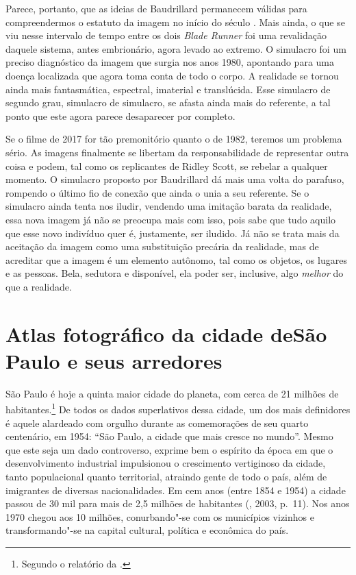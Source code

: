 Parece, portanto, que as ideias de Baudrillard permanecem válidas para
compreendermos o estatuto da imagem no início do século . Mais ainda,
o que se viu nesse intervalo de tempo entre os dois \emph{Blade Runner}
foi uma revalidação daquele sistema, antes embrionário, agora levado ao
extremo. O simulacro foi um preciso diagnóstico da imagem que surgia nos
anos 1980, apontando para uma doença localizada que agora toma conta de
todo o corpo. A realidade se tornou ainda mais fantasmática, espectral,
imaterial e translúcida. Esse simulacro de segundo grau, simulacro de
simulacro, se afasta ainda mais do referente, a tal ponto que este agora
parece desaparecer por completo.

Se o filme de 2017 for tão premonitório quanto o de 1982, teremos um
problema sério. As imagens finalmente se libertam da responsabilidade de
representar outra coisa e podem, tal como os replicantes de Ridley
Scott, se rebelar a qualquer momento. O simulacro proposto por
Baudrillard dá mais uma volta do parafuso, rompendo o último fio de
conexão que ainda o unia a seu referente. Se o simulacro ainda tenta nos
iludir, vendendo uma imitação barata da realidade, essa nova imagem já
não se preocupa mais com isso, pois sabe que tudo aquilo que esse novo
indivíduo quer é, justamente, ser iludido. Já não se trata mais da
aceitação da imagem como uma substituição precária da realidade, mas de
acreditar que a imagem é um elemento autônomo, tal como os objetos, os
lugares e as pessoas. Bela, sedutora e disponível, ela poder ser,
inclusive, algo \emph{melhor} do que a realidade.


\chapter*{Atlas fotográfico da cidade de\break São Paulo e seus arredores}

São Paulo é hoje a quinta maior cidade do planeta, com cerca de 21
milhões de habitantes.\footnote{Segundo o relatório da  {}.} De todos os dados superlativos dessa cidade,
um dos mais definidores é aquele alardeado com orgulho durante as
comemorações de seu quarto centenário, em 1954: ``São Paulo, a cidade
que mais cresce no mundo''. Mesmo que este seja um dado controverso,
exprime bem o espírito da época em que o desenvolvimento industrial
impulsionou o crescimento vertiginoso da cidade, tanto populacional
quanto territorial, atraindo gente de todo o país, além de imigrantes de
diversas nacionalidades. Em cem anos (entre 1854 e 1954) a cidade passou
de 30 mil para mais de 2,5 milhões de habitantes (, 2003, p.~11).
Nos anos 1970 chegou aos 10 milhões, conurbando"-se com os municípios
vizinhos e transformando"-se na capital cultural, política e econômica do
país.

